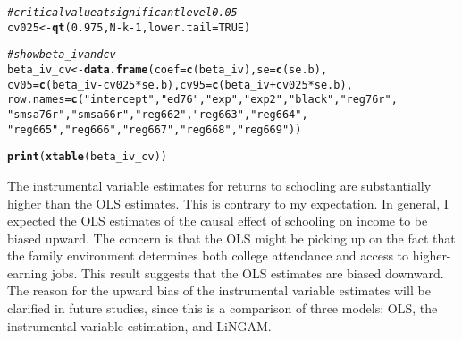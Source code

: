 \documentclass{article}\usepackage[]{graphicx}\usepackage[]{xcolor}
\makeatletter
\newcommand{\hlnum}[1]{\textcolor[rgb]{0.686,0.059,0.569}{#1}}%
\newcommand{\hlstr}[1]{\textcolor[rgb]{0.192,0.494,0.8}{#1}}%
\newcommand{\hlcom}[1]{\textcolor[rgb]{0.678,0.584,0.686}{\textit{#1}}}%
\newcommand{\hlopt}[1]{\textcolor[rgb]{0,0,0}{#1}}%
\newcommand{\hlstd}[1]{\textcolor[rgb]{0.345,0.345,0.345}{#1}}%
\newcommand{\hlkwb}[1]{\textcolor[rgb]{0.69,0.353,0.396}{#1}}%
\newcommand{\hlkwc}[1]{\textcolor[rgb]{0.333,0.667,0.333}{#1}}%
\newcommand{\hlkwd}[1]{\textcolor[rgb]{0.737,0.353,0.396}{\textbf{#1}}}%
\newenvironment{kframe}{%
 \def\at@end@of@kframe{}%
 \ifinner\ifhmode%
  \def\at@end@of@kframe{\end{minipage}}%
  \begin{minipage}{\columnwidth}%
 \fi\fi%
 \def\FrameCommand##1{\hskip\@totalleftmargin \hskip-\fboxsep
 \colorbox{shadecolor}{##1}\hskip-\fboxsep
     \hskip-\linewidth \hskip-\@totalleftmargin \hskip\columnwidth}%
 \MakeFramed {\advance\hsize-\width
   \@totalleftmargin\z@ \linewidth\hsize
   \@setminipage}}%
 {\par\unskip\endMakeFramed%
 \at@end@of@kframe}
\makeatother
\begin{document}
\begin{kframe}
{\ttfamily\noindent\bfseries\color{errorcolor}{\#\# Error in eval(expr, envir, enclos): object 'k' not found}}\begin{alltt}
\hlcom{# critical value at significant level 0.05}
\hlstd{cv025} \hlkwb{<-} \hlkwd{qt}\hlstd{(}\hlnum{0.975}\hlstd{, N}\hlopt{-}\hlstd{k}\hlopt{-}\hlnum{1}\hlstd{,} \hlkwc{lower.tail}\hlstd{=}\hlnum{TRUE}\hlstd{)}
\end{alltt}


{\ttfamily\noindent\bfseries\color{errorcolor}{\#\# Error in qt(0.975, N - k - 1, lower.tail = TRUE): object 'N' not found}}\begin{alltt}
\hlcom{# show beta_iv and cv}
\hlstd{beta_iv_cv}\hlkwb{<-}\hlkwd{data.frame}\hlstd{(}\hlkwc{coef}\hlstd{=}\hlkwd{c}\hlstd{(beta_iv),}\hlkwc{se}\hlstd{=}\hlkwd{c}\hlstd{(se.b),}
                       \hlkwc{cv05}\hlstd{=}\hlkwd{c}\hlstd{(beta_iv}\hlopt{-}\hlstd{cv025}\hlopt{*}\hlstd{se.b),}\hlkwc{cv95}\hlstd{=}\hlkwd{c}\hlstd{(beta_iv}\hlopt{+}\hlstd{cv025}\hlopt{*}\hlstd{se.b),}
           \hlkwc{row.names} \hlstd{=} \hlkwd{c}\hlstd{(}\hlstr{"intercept"}\hlstd{,}\hlstr{"ed76"}\hlstd{,}\hlstr{"exp"}\hlstd{,}\hlstr{"exp2"}\hlstd{,}\hlstr{"black"}\hlstd{,}\hlstr{"reg76r"}\hlstd{,}
                         \hlstr{"smsa76r"}\hlstd{,}\hlstr{"smsa66r"}\hlstd{,}\hlstr{"reg662"}\hlstd{,}\hlstr{"reg663"}\hlstd{,}\hlstr{"reg664"}\hlstd{,}
                         \hlstr{"reg665"}\hlstd{,}\hlstr{"reg666"}\hlstd{,}\hlstr{"reg667"}\hlstd{,}\hlstr{"reg668"}\hlstd{,}\hlstr{"reg669"}\hlstd{))}
\end{alltt}


{\ttfamily\noindent\bfseries\color{errorcolor}{\#\# Error in data.frame(coef = c(beta\_iv), se = c(se.b), cv05 = c(beta\_iv - : object 'beta\_iv' not found}}\begin{alltt}
\hlkwd{print}\hlstd{(}\hlkwd{xtable}\hlstd{(beta_iv_cv))}
\end{alltt}


{\ttfamily\noindent\bfseries\color{errorcolor}{\#\# Error in xtable(beta\_iv\_cv): object 'beta\_iv\_cv' not found}}\end{kframe}

The instrumental variable estimates for returns to schooling are substantially higher than the OLS estimates. This is contrary to my expectation.
In general, I expected the OLS estimates of the causal effect of schooling on income to be biased upward.
The concern is that the OLS might be picking up on the fact that the family environment determines both college attendance and access to higher-earning jobs. 
This result suggests that the OLS estimates are biased downward. 
The reason for the upward bias of the instrumental variable estimates will be clarified in future studies, 
since this is a comparison of three models: OLS, the instrumental variable estimation, and LiNGAM.
\end{document}
